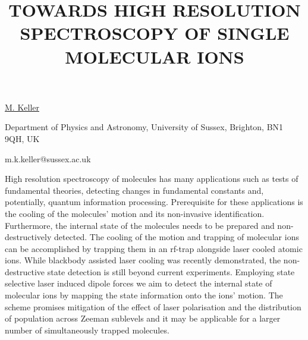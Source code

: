 \title{TOWARDS HIGH RESOLUTION SPECTROSCOPY OF SINGLE MOLECULAR IONS}

\underline{M. Keller}

{\normalsize{\vspace{-4mm}
Department of Physics and Astronomy,
University of Sussex,
Brighton, BN1 9QH, UK

\email m.k.keller@sussex.ac.uk}}

High resolution spectroscopy of molecules has many applications such as tests of fundamental theories, detecting changes in fundamental constants and, potentially, quantum information processing. Prerequisite for these applications is the cooling of the molecules' motion and its non-invasive identification. Furthermore, the internal state of the molecules needs to be prepared and non-destructively detected.
The cooling of the motion and trapping of molecular ions can be accomplished by trapping them in an rf-trap alongside laser cooled atomic ions.
While blackbody assisted laser cooling was recently demonstrated, the non-destructive state detection is still beyond current experiments. Employing state selective laser induced dipole forces we aim to detect the internal state of molecular ions by mapping the state information onto the ions' motion. The scheme promises mitigation of the effect of laser polarisation and the distribution of population across Zeeman sublevels and it may be applicable for a larger number of simultaneously trapped molecules.

\vspace{\baselineskip}
